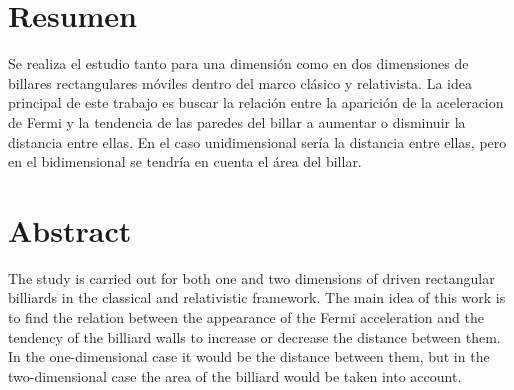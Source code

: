 \chapter*{Resumen}

Se realiza el estudio tanto para una dimensión como en dos dimensiones de billares rectangulares móviles dentro del marco clásico y relativista. La idea principal de este trabajo es buscar la relación entre la aparición de la aceleracion de Fermi y la tendencia de las paredes del billar a aumentar o disminuir la distancia entre ellas. En el caso unidimensional sería la distancia entre ellas, pero en el bidimensional se tendría en cuenta el área del billar.

\vspace{5cm}


{\let\clearpage\relax\chapter*{Abstract}}

The study is carried out for both one and two dimensions of driven rectangular billiards in the classical and relativistic framework. The main idea of this work is to find the relation between the appearance of the Fermi acceleration and the tendency of the billiard walls to increase or decrease the distance between them. In the one-dimensional case it would be the distance between them, but in the two-dimensional case the area of the billiard would be taken into account.



